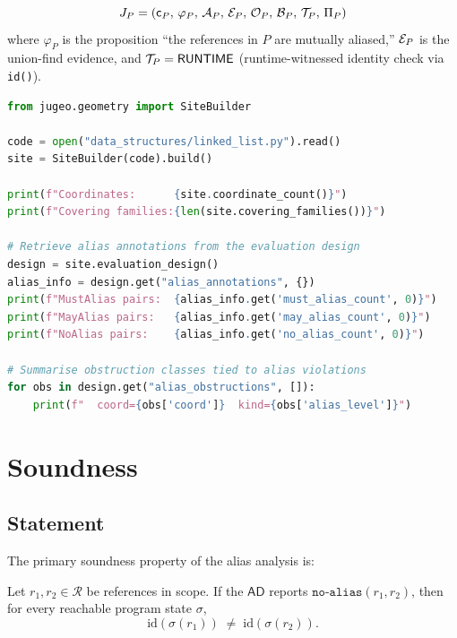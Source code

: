 \documentclass[11pt]{article}
\newcommand{\NoAlias}{\ensuremath{\mathtt{no\text{-}alias}}}     %
\newcommand{\AD}{\mathsf{AD}}               %
\begin{document}
\[
  J_P = (\mathsf{c}_P,\,\varphi_P,\,\mathcal{A}_P,\,\mathcal{E}_P,\,\mathcal{O}_P,\,\mathcal{B}_P,\,\mathcal{T}_P,\,\Pi_P)
\]
where $\varphi_P$ is the proposition ``the references in $P$ are
mutually aliased,'' $\mathcal{E}_P$ is the union-find evidence, and
$\mathcal{T}_P = \mathsf{RUNTIME}$ (runtime-witnessed identity check via
\texttt{id()}).

\begin{lstlisting}[language=Python, caption={Using the \JuGeo{} API to inspect heap alias information embedded in the semantic site.}]
from jugeo.geometry import SiteBuilder

code = open("data_structures/linked_list.py").read()
site = SiteBuilder(code).build()

print(f"Coordinates:      {site.coordinate_count()}")
print(f"Covering families:{len(site.covering_families())}")

# Retrieve alias annotations from the evaluation design
design = site.evaluation_design()
alias_info = design.get("alias_annotations", {})
print(f"MustAlias pairs:  {alias_info.get('must_alias_count', 0)}")
print(f"MayAlias pairs:   {alias_info.get('may_alias_count', 0)}")
print(f"NoAlias pairs:    {alias_info.get('no_alias_count', 0)}")

# Summarise obstruction classes tied to alias violations
for obs in design.get("alias_obstructions", []):
    print(f"  coord={obs['coord']}  kind={obs['alias_level']}")
\end{lstlisting}

\section{Soundness}
\label{sec:soundness}

\subsection{Statement}

The primary soundness property of the alias analysis is:

\begin{theorem}
  \label{thm:soundness}
  Let $r_1, r_2 \in \mathcal{R}$ be references in scope.  If the
  $\AD$ reports $\NoAlias(r_1, r_2)$, then for every reachable program
  state $\sigma$,
  \[
    \mathrm{id}(\sigma(r_1)) \;\neq\; \mathrm{id}(\sigma(r_2)).
  \]
\end{theorem}
\end{document}
